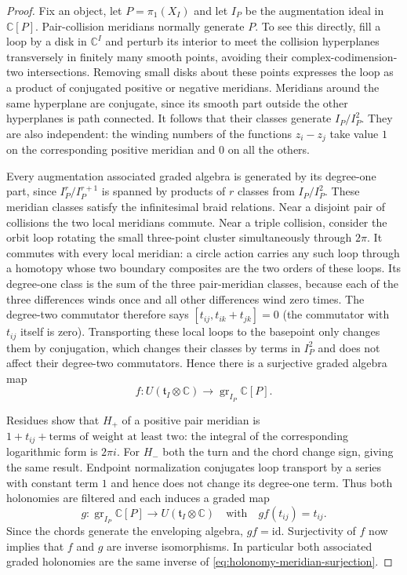 \documentclass[11pt]{article}
\newcommand{\CC}{\mathbb C}
\newcommand{\id}{\mathrm{id}}
\theoremstyle{definition}
\theoremstyle{remark}
\numberwithin{equation}{section}
\begin{document}
\begin{proof}
Fix an object, let $P=\pi_1(X_I)$ and let $I_P$ be the augmentation
ideal in $\CC[P]$.  Pair-collision meridians normally generate $P$.
To see this directly, fill a loop by a disk in $\CC^I$ and perturb its
interior to meet the collision hyperplanes transversely in finitely
many smooth points, avoiding their complex-codimension-two
intersections.  Removing small disks about these points expresses the
loop as a product of conjugated positive or negative meridians.
Meridians around the same hyperplane are conjugate, since its smooth
part outside the other hyperplanes is path connected.  It follows
that their classes generate $I_P/I_P^2$.  They are also independent:
the winding numbers of the functions $z_i-z_j$ take value $1$ on the
corresponding positive meridian and $0$ on all the others.

Every augmentation associated graded algebra is generated by its
degree-one part, since $I_P^r/I_P^{r+1}$ is spanned by products of $r$
classes from $I_P/I_P^2$.  These meridian classes satisfy the
infinitesimal braid relations.  Near a disjoint pair of collisions
the two local meridians commute.  Near a triple collision, consider
the orbit loop rotating the small three-point cluster simultaneously
through $2\pi$.  It commutes with every local meridian: a circle
action carries any such loop through a homotopy whose two boundary
composites are the two orders of these loops.  Its degree-one class
is the sum of the three pair-meridian classes, because each of the
three differences winds once and all other differences wind zero
times.  The degree-two commutator therefore says
$[t_{ij},t_{ik}+t_{jk}]=0$ (the commutator with $t_{ij}$ itself is
zero).  Transporting these local loops to the basepoint only changes
them by conjugation, which changes their classes by terms in $I_P^2$
and does not affect their degree-two commutators.  Hence there is a
surjective graded algebra map
\begin{equation}\label{eq:holonomy-meridian-surjection}
 f:U(\mathfrak t_I\otimes\CC)
 \longrightarrow\operatorname{gr}_{I_P}\CC[P].
\end{equation}

Residues show that $H_+$ of a positive pair meridian is
$1+t_{ij}+\text{terms of weight at least two}$: the integral of the
corresponding logarithmic form is $2\pi i$.  For $H_-$ both the turn
and the chord change sign, giving the same result.  Endpoint
normalization conjugates loop transport by a series with constant
term $1$ and hence does not change its degree-one term.  Thus both
holonomies are filtered and each induces a graded map
\[
 g:\operatorname{gr}_{I_P}\CC[P]
 \longrightarrow U(\mathfrak t_I\otimes\CC)
 \quad\text{with}\quad g f(t_{ij})=t_{ij}.
\]
Since the chords generate the enveloping algebra, $gf=\id$.
Surjectivity of $f$ now implies that $f$ and $g$ are inverse
isomorphisms.  In particular both associated graded holonomies are
the same inverse of \eqref{eq:holonomy-meridian-surjection}.


\end{proof}
\end{document}
